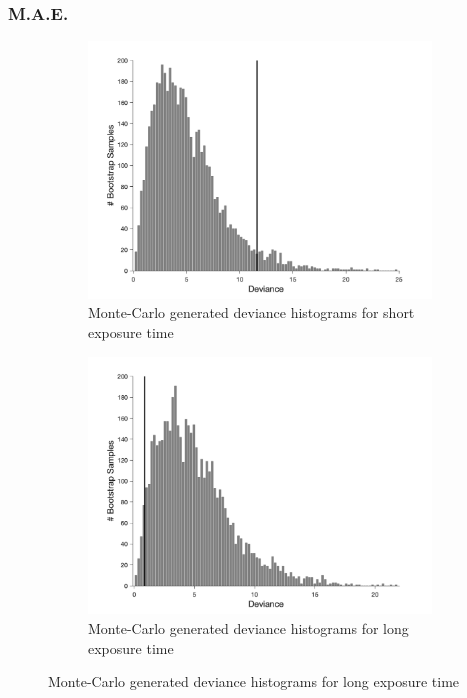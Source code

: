 \documentclass{article}
\begin{document}
\subsubsection*{M.A.E.}
\begin{figure}[!hb]
    \begin{subfigure}{0.494\textwidth}
        \centering
        \includegraphics[width = \linewidth]{Thesis/plots/gof/cutNo/cutNo_mae_short_bootstrap.png}
        \caption{Monte-Carlo generated deviance histograms for short exposure time}
        \label{fig:da_gof_short_bootstrap}
    \end{subfigure}
    \hspace{0.01\textwidth}
    \begin{subfigure}{0.494\textwidth}
        \centering
        \includegraphics[width = \linewidth]{Thesis/plots/gof/cutNo/cutNo_mae_long_bootstrap.png}
        \caption{Monte-Carlo generated deviance histograms for long exposure time}
        \label{fig:da_gof_long_bootstrap}
    \end{subfigure}
    

\end{figure}
\end{document}
